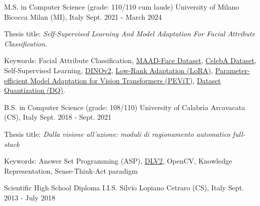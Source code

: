 

\begin{cventries}

\cventry
    {M.S. in Computer Science (grade: 110/110 cum laude)} %
    {University of Milano Bicocca} %
    {Milan (MI), Italy} %
    {Sept. 2021 - March 2024} %
    {
      \begin{cvitems} %
        \item Thesis title: \textit{Self-Supervised Learning And Model Adaptation For Facial Attribute Classification}.
        \item Keywords: Facial Attribute Classification, \href{https://arxiv.org/abs/2012.01030}{MAAD-Face Dataset}, \href{https://arxiv.org/abs/1411.7766}{CelebA Dataset}, Self-Supervised Learning, \href{https://arxiv.org/abs/2304.07193}{DINOv2}, \href{https://arxiv.org/abs/2106.09685}{Low-Rank Adaptation (LoRA)}, \href{https://arxiv.org/abs/2203.16329}{Parameter-efficient Model Adaptation for Vision Transformers (PEViT)}, \href{https://arxiv.org/abs/2308.10524}{Dataset Quantization (DQ)}.
      \end{cvitems}
    }
    
\cventry
    {B.S. in Computer Science (grade: 108/110)} %
    {University of Calabria} %
    {Arcavacata (CS), Italy} %
    {Sept. 2018 - Sept. 2021} %
    {
      \begin{cvitems} %
        \item Thesis title: \textit{Dalla visione all'azione: moduli di ragionamento automatico full-stack}
        \item Keywords: Answer Set Programming (ASP), \href{https://dlv.demacs.unical.it/home}{DLV2}, OpenCV, Knowledge Representation, Sense-Think-Act paradigm
      \end{cvitems}
    }
    

\cventry
    {Scientific High School Diploma} %
    {I.I.S. Silvio Lopiano} %
    {Cetraro (CS), Italy} %
    {Sept. 2013 - July 2018} %
    {
      \begin{cvitems} %
      \end{cvitems}
    }


\end{cventries}
